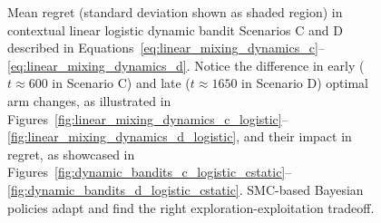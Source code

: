 \begin{figure}[!h]
	\caption{
		Mean regret (standard deviation shown as shaded region) in contextual linear logistic dynamic bandit Scenarios C and D
		described in Equations~\eqref{eq:linear_mixing_dynamics_c}--\eqref{eq:linear_mixing_dynamics_d}.
		Notice the difference in early ($t\approx600$ in Scenario C) and late ($t\approx1650$ in Scenario D) optimal arm changes,
			as illustrated in Figures~\ref{fig:linear_mixing_dynamics_c_logistic}--\ref{fig:linear_mixing_dynamics_d_logistic},
		and their impact in regret,
			as showcased in Figures~\ref{fig:dynamic_bandits_c_logistic_cstatic}--\ref{fig:dynamic_bandits_d_logistic_cstatic}.
		SMC-based Bayesian policies adapt and find the right exploration-exploitation tradeoff.}
	\label{fig:dynamic_bandits_logistic}
\end{figure}

